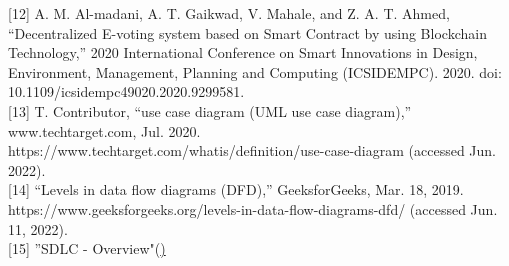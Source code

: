 \documentclass[a4paper,12pt]{report}
\begin{document}
[12]	A. M. Al-madani, A. T. Gaikwad, V. Mahale, and Z. A. T. Ahmed, “Decentralized E-voting system based on Smart Contract by using Blockchain Technology,” 2020 International Conference on Smart Innovations in Design, Environment, Management, Planning and Computing (ICSIDEMPC). 2020. doi: 10.1109/icsidempc49020.2020.9299581.\\

[13]	T. Contributor, “use case diagram (UML use case diagram),” www.techtarget.com, Jul. 2020. https://www.techtarget.com/whatis/definition/use-case-diagram (accessed Jun. 2022).\\

[14]	“Levels in data flow diagrams (DFD),” GeeksforGeeks, Mar. 18, 2019. https://www.geeksforgeeks.org/levels-in-data-flow-diagrams-dfd/ (accessed Jun. 11, 2022).\\


[15] ''SDLC - Overview"(\href{ https://www.tutorialspoint.com/sdlc/sdlc_overview.htm})%
\end{document}
